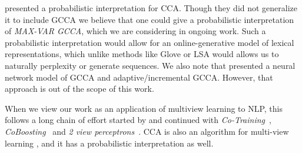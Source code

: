 \documentclass[11pt]{article}
\begin{document}
 presented a probabilistic
interpretation for CCA. Though they did not generalize it to include
GCCA we believe that one could give a probabilistic interpretation of
\emph{MAX-VAR GCCA}, which we are considering in ongoing work.  Such a
probabilistic interpretation would allow for an online-generative model of
lexical representations, which unlike methods like Glove or LSA would
allows us to naturally perplexity or generate sequences. We also note
that  presented a neural network model of GCCA
and adaptive/incremental GCCA. However, that approach is out of the
scope of this work.

When we view our work as an application of multiview learning to NLP,
this follows a long chain of effort started by
 and continued with
\emph{Co-Training}~\cite{blum1998combining},
\emph{CoBoosting}~\cite{collins1999unsupervised} and \emph{2 view
  perceptrons}~\cite{brefeld2006efficient}.  CCA is also an algorithm
for multi-view learning \cite{kakade2007multi,ganchevuai08}, and it
has a probabilistic interpretation \cite{bach2005probabilistic} as
well.
\end{document}

